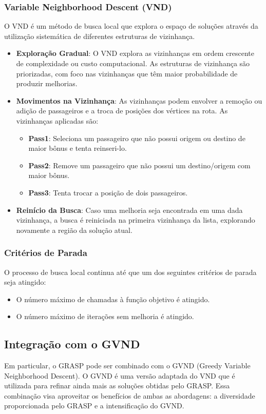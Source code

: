 \documentclass[12pt, a4paper]{report}
\begin{document}
\subsubsection*{Variable Neighborhood Descent (VND)}

O VND é um método de busca local que explora o espaço de soluções através da utilização sistemática de diferentes estruturas de vizinhança.

\begin{itemize}
     \item \textbf{Exploração Gradual}: O VND explora as vizinhanças em ordem crescente de complexidade ou custo computacional.  As estruturas de vizinhança são priorizadas, com foco nas vizinhanças que têm maior probabilidade de produzir melhorias.
     \item \textbf{Movimentos na Vizinhança}: As vizinhanças podem envolver a remoção ou adição de passageiros e a troca de posições dos vértices na rota. As vizinhanças aplicadas são:
       \begin{itemize}
            \item \textbf{Pass1}: Seleciona um passageiro que não possui origem ou destino de maior bônus e tenta reinseri-lo.
            \item \textbf{Pass2}: Remove um passageiro que não possui um destino/origem com maior bônus.
            \item \textbf{Pass3}: Tenta trocar a posição de dois passageiros.
        \end{itemize}
       \item \textbf{Reinício da Busca}: Caso uma melhoria seja encontrada em uma dada vizinhança, a busca é reiniciada na primeira vizinhança da lista, explorando novamente a região da solução atual.
\end{itemize}
\subsubsection*{Critérios de Parada}
O processo de busca local continua até que um dos seguintes critérios de parada seja atingido:

\begin{itemize}
     \item  O número máximo de chamadas à função objetivo é atingido.
     \item  O número máximo de iterações sem melhoria é atingido.
\end{itemize}

\subsection*{Integração com o GVND}
Em particular, o GRASP pode ser combinado com o GVND (Greedy Variable Neighborhood Descent). O GVND é uma versão adaptada do VND que é utilizada para refinar ainda mais as soluções obtidas pelo GRASP. Essa combinação visa aproveitar os benefícios de ambas as abordagens: a diversidade proporcionada pelo GRASP e a intensificação do GVND.
\end{document}
